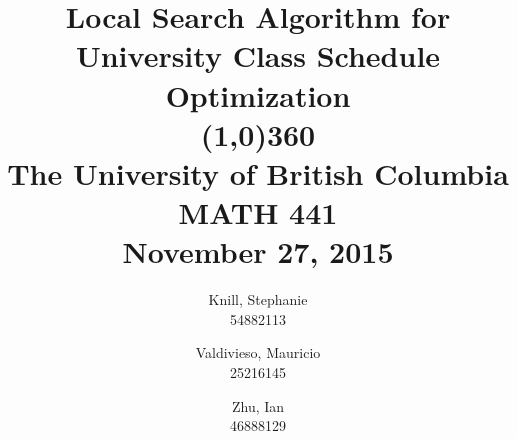 \documentclass[11pt, oneside]{article}   	%
\begin{document}
\title{Local Search Algorithm for University Class Schedule Optimization \\
\line(1,0){360} \\               %
\vspace{1cm}
\large
The University of British Columbia \\
MATH 441 \\
November 27, 2015
\vspace{1cm}}


\author{
Knill, Stephanie\\
54882113
\and
Valdivieso, Mauricio\\
25216145
\and
Zhu, Ian\\
46888129
}

\date{}                    %
\maketitle


\thispagestyle{empty}    %


\cleardoublepage
\tableofcontents

\thispagestyle{empty}   %




\end{document}
